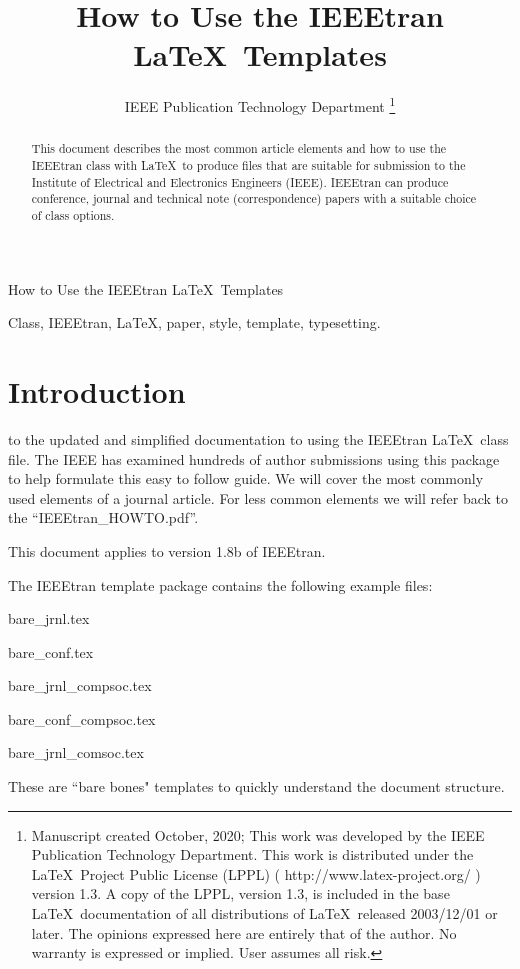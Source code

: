 \documentclass[lettersize,journal]{IEEEtran}
\begin{document}
\title{How to Use the IEEEtran \LaTeX \ Templates}
\author{IEEE Publication Technology Department
  \thanks{Manuscript created October, 2020; This work was developed by the IEEE Publication Technology Department. This work is distributed under the \LaTeX \ Project Public License (LPPL) ( http://www.latex-project.org/ ) version 1.3. A copy of the LPPL, version 1.3, is included in the base \LaTeX \ documentation of all distributions of \LaTeX \ released 2003/12/01 or later. The opinions expressed here are entirely that of the author. No warranty is expressed or implied. User assumes all risk.}}

%
{How to Use the IEEEtran \LaTeX \ Templates}

\maketitle

\begin{abstract}
  This document describes the most common article elements and how to use the IEEEtran class with \LaTeX \ to produce files that are suitable for submission to the Institute of Electrical and Electronics Engineers (IEEE).  IEEEtran can produce conference, journal and technical note (correspondence) papers with a suitable choice of class options.
\end{abstract}

\begin{IEEEkeywords}
  Class, IEEEtran, \LaTeX, paper, style, template, typesetting.
\end{IEEEkeywords}


\section{Introduction}
 to the updated and simplified documentation to using the IEEEtran \LaTeX \ class file. The IEEE has examined hundreds of author submissions using this package to help formulate this easy to follow guide. We will cover the most commonly used elements of a journal article. For less common elements we will refer back to the ``IEEEtran\_HOWTO.pdf''.

This document applies to version 1.8b of IEEEtran.

The IEEEtran template package contains the following example files:
\begin{list}{}{}
  \item{bare\_jrnl.tex}
  \item{bare\_conf.tex}
  \item{bare\_jrnl\_compsoc.tex}
  \item{bare\_conf\_compsoc.tex}
  \item{bare\_jrnl\_comsoc.tex}
\end{list}
These are ``bare bones" templates to quickly understand the document structure.
\end{document}
